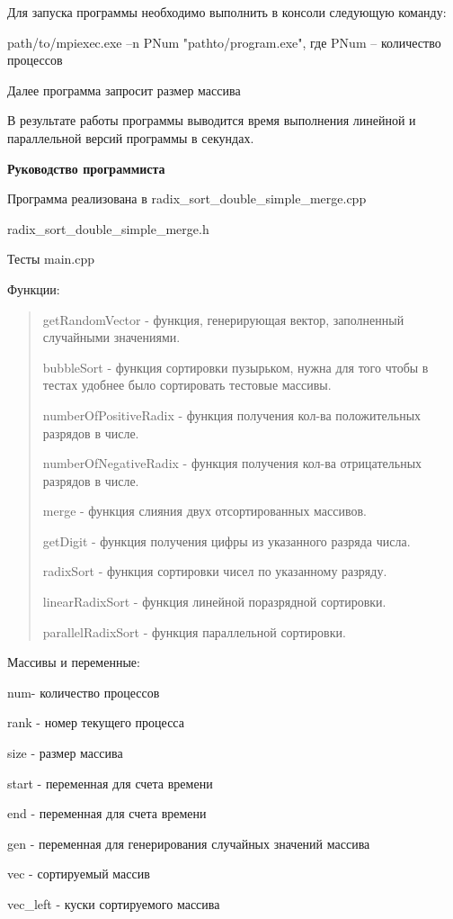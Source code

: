 \documentclass[]{article}
\begin{document}
Для запуска программы необходимо выполнить в консоли следующую команду:

path/to/mpiexec.exe --n PNum "pathto/program.exe", где PNum --
количество процессов

Далее программа запросит размер массива

В результате работы программы выводится время выполнения линейной и
параллельной версий программы в секундах.

\textbf{Руководство программиста}

Программа реализована в radix\_sort\_double\_simple\_merge.cpp

radix\_sort\_double\_simple\_merge.h

Тесты main.cpp

Функции:

\begin{quote}
\protect\hypertarget{_heading=h.gjdgxs}{}{}getRandomVector - функция,
генерирующая вектор, заполненный случайными значениями.

bubbleSort - функция сортировки пузырьком, нужна для того чтобы в тестах
удобнее было сортировать тестовые массивы.

numberOfPositiveRadix - функция получения кол-ва положительных разрядов
в числе.

numberOfNegativeRadix - функция получения кол-ва отрицательных разрядов
в числе.

merge - функция слияния двух отсортированных массивов.

getDigit - функция получения цифры из указанного разряда числа.

radixSort - функция сортировки чисел по указанному разряду.

linearRadixSort - функция линейной поразрядной сортировки.

parallelRadixSort - функция параллельной сортировки.
\end{quote}

Массивы и переменные:

num- количество процессов

rank - номер текущего процесса

size - размер массива

start - переменная для счета времени

end - переменная для счета времени

gen - переменная для генерирования случайных значений массива

vec - сортируемый массив

vec\_left - куски сортируемого массива
\end{document}
